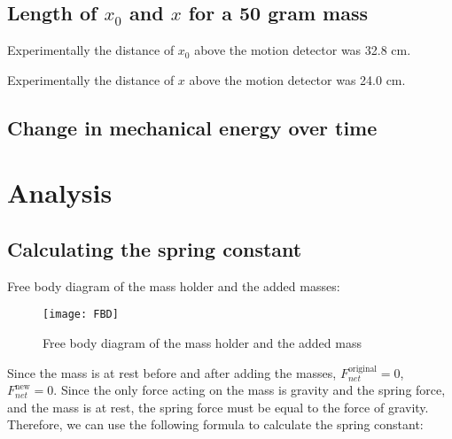 \documentclass{article}
\begin{document}
        \subsection{Length of $x_0$ and $x$ for a 50 gram mass}
            Experimentally the distance of $x_0$ above the motion detector was 32.8 cm. %
            
            Experimentally the distance of $x$ above the motion detector was 24.0 cm. %
        
        \subsection{Change in mechanical energy over time}\label{subsec:change-in-mechanical-energy-over-time-data}
    
    
    \section{Analysis}\label{sec:analysis}
        
        \subsection{Calculating the spring constant}\label{subsec:calculating-the-spring-constant}
            
            Free body diagram of the mass holder and the added masses:
            \begin{figure}[H]
                \centering
                \texttt{[image: FBD]}
                \caption{Free body diagram of the mass holder and the added mass}
                \label{fig:FBD}
            \end{figure}
            
            Since the mass is at rest before and after adding the masses, $F_{net}^{\text{original}} = 0$, $F_{net}^{\text{new}} = 0$.
            Since the only force acting on the mass is gravity and the spring force, and the mass is at rest, the spring force must be equal to the force of gravity.
            Therefore, we can use the following formula to calculate the spring constant:
            
            
\end{document}
